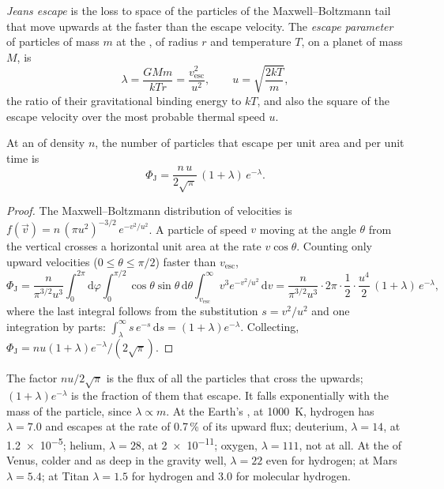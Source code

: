 \begin{definition}\label{def:b3:planetary-atmospheres:jeans-escape}
\emph{Jeans escape} is the loss to space of the
particles of the Maxwell--Boltzmann tail that move upwards at the 
faster than the escape velocity. The \emph{escape
parameter} of particles of mass $m$ at the ,
of radius $r$ and temperature $T$, on a planet of mass $M$, is
\[
\lambda = \frac{GMm}{kTr} = \frac{v_\mathrm{esc}^2}{u^2},
\qquad u = \sqrt{\frac{2kT}m},
\]
the ratio of their gravitational binding energy to $kT$, and also the
square of the escape velocity over the most probable thermal speed $u$.
\end{definition}

\begin{theorem}\label{thm:b3:planetary-atmospheres:jeans}
At an  of density $n$, the number of particles that escape per unit
area and per unit time is
\[
\Phi_\mathrm J = \frac{n\,u}{2\sqrt\pi}\,(1 + \lambda)\,e^{-\lambda}.
\]
\end{theorem}

\begin{proof}
The Maxwell--Boltzmann distribution of velocities is $f(\vec v) =
n\,(\pi u^2)^{-3/2}\,e^{-v^2/u^2}$. A particle of speed $v$ moving at the
angle $\theta$ from the vertical crosses a horizontal unit area at the
rate $v\cos\theta$. Counting only upward velocities ($0 \le \theta \le
\pi/2$) faster than $v_\mathrm{esc}$,
\[
\Phi_\mathrm J = \frac{n}{\pi^{3/2}u^3}\int_0^{2\pi}\!\!\mathrm d\varphi
\int_0^{\pi/2}\!\!\cos\theta\sin\theta\,\mathrm d\theta
\int_{v_\mathrm{esc}}^\infty v^3e^{-v^2/u^2}\,\mathrm dv
= \frac{n}{\pi^{3/2}u^3}\cdot2\pi\cdot\frac12\cdot
\frac{u^4}2\,(1 + \lambda)\,e^{-\lambda},
\]
where the last integral follows from the substitution $s = v^2/u^2$ and
one integration by parts: $\int_\lambda^\infty s\,e^{-s}\,\mathrm ds =
(1 + \lambda)e^{-\lambda}$. Collecting, $\Phi_\mathrm J = n u (1 +
\lambda) e^{-\lambda}/(2\sqrt\pi)$.
\end{proof}

The factor $n u/2\sqrt\pi$ is the flux of all the particles that cross
the  upwards; $(1 + \lambda)e^{-\lambda}$ is the fraction of them
that escape. It falls exponentially with the mass of the particle, since
$\lambda \propto m$. At the Earth's , at \qty{1000}{K}, hydrogen
has $\lambda = 7.0$ and escapes at the rate of 0.7\,\% of its upward
flux; deuterium, $\lambda = 14$, at \num{1.2e-5}; helium, $\lambda = 28$,
at \num{2e-11}; oxygen, $\lambda = 111$, not at all. At the  of
Venus, colder and as deep in the gravity well, $\lambda = 22$ even for
hydrogen; at Mars $\lambda = 5.4$; at Titan $\lambda = 1.5$ for hydrogen
and 3.0 for molecular hydrogen.

